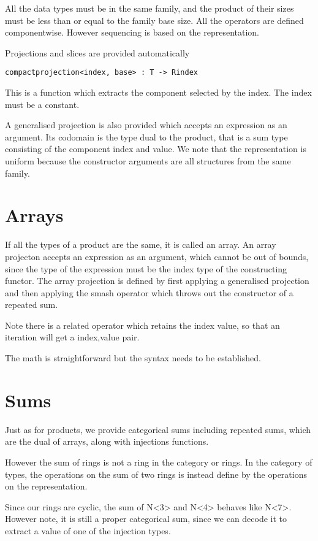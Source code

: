 \documentclass[oneside]{book}
\theoremstyle{plain}
\theoremstyle{definition}
\theoremstyle{plain}
\begin{document}
All the data types must be in the same family, and the product
of their sizes must be less than or equal to the family base size.
All the operators are defined componentwise. However sequencing
is based on the representation.

Projections and slices are provided automatically
\begin{verbatim}
compactprojection<index, base> : T -> Rindex
\end{verbatim}
This is a function which extracts the component selected
by the index. The index must be a constant.

A generalised projection is also provided which accepts an
expression as an argument. Its codomain is the type dual
to the product, that is a sum type consisting of the component
index and value.  We note that the representation is uniform because
the constructor arguments are all structures from the same family.

\section{Arrays}
If all the types of a product are the same, it is called an array.
An array projecton accepts an expression as an argument, which cannot
be out of bounds, since the type of the expression must be the index
type of the constructing functor. The array projection is defined by
first applying a generalised projection and then applying the smash 
operator which throws out the constructor of a repeated sum.

Note there is a related operator which retains the index value,
so that an iteration will get a index,value pair.

The math is straightforward but the syntax needs to be established.

\section{Sums}
Just as for products, we provide categorical sums including
repeated sums, which are the dual of arrays, along with 
injections functions.

However the sum of rings is not a ring in the category or rings.
In the category of types, the operations on the sum of two rings
is instead define by the operations on the representation.

Since our rings are cyclic, the sum of N<3> and N<4> behaves like
N<7>. However note, it is still a proper categorical sum, since we
can decode it to extract a value of one of the injection types.
\end{document}
